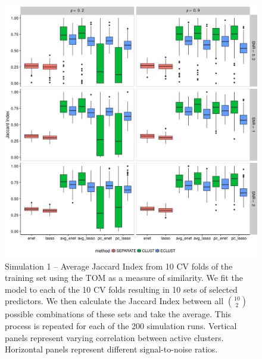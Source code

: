 \begin{figure}[H]
	\centering
	\includegraphics[scale=0.6, keepaspectratio]{./figs/hydra/results/figures/sim1-sept10/jacc_TOM_sim1.png}
	\caption{Simulation 1 -- Average Jaccard Index from 10 CV folds of the training set using the TOM as a measure of similarity. We fit the model to each of the 10 CV folds resulting in 10 sets of selected predictors. We then calculate the Jaccard Index between all $\binom{10}{2}$ possible combinations of these sets and take the average. This process is repeated for each of the 200 simulation runs. Vertical panels represent varying correlation between active clusters. Horizontal panels represent different signal-to-noise ratios.}
	\label{fig:jacc_TOM_sim1}
\end{figure}


